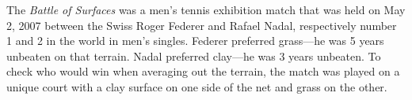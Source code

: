 The \emph{Battle of Surfaces} was a men's tennis exhibition match that was held on May 2, 2007 between the Swiss Roger Federer and Rafael Nadal, respectively
number 1 and 2 in the world in men's singles. Federer preferred grass---he was 5 years unbeaten on that terrain. Nadal preferred clay---he was 3 years unbeaten.
To check who would win when averaging out the terrain, the match was played on a unique court with a clay surface on one side of the net and grass on the other.
